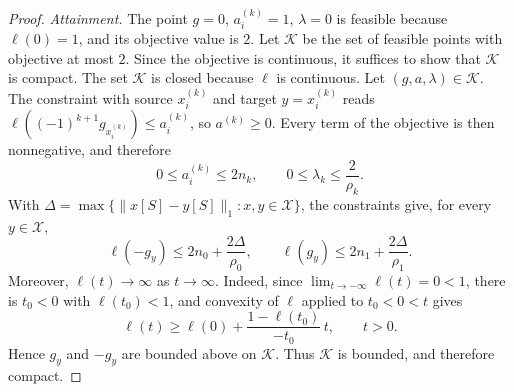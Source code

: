 \documentclass[11pt,a4paper]{article}
\theoremstyle{plain}
\begin{document}
\begin{proof}
\emph{Attainment.}
The point $g=0$, $a_i^{(k)}=1$, $\lambda=0$ is feasible because
$\ell(0)=1$, and its objective value is $2$. Let $\mathcal K$ be the
set of feasible points with objective at most $2$. Since the objective
is continuous, it suffices to show that $\mathcal K$ is compact. The
set $\mathcal K$ is closed because $\ell$ is continuous. Let
$(g,a,\lambda)\in\mathcal K$. The constraint with source $x_i^{(k)}$
and target $y=x_i^{(k)}$ reads
$\ell((-1)^{k+1}g_{x_i^{(k)}})\le a_i^{(k)}$, so $a^{(k)}\ge0$. Every
term of the objective is then nonnegative, and therefore
\[
0\le a_i^{(k)}\le2n_k,\qquad 0\le\lambda_k\le\frac2{\rho_k}.
\]
With $\Delta=\max\{\|x[S]-y[S]\|_1:x,y\in\mathcal X\}$, the
constraints give, for every $y\in\mathcal X$,
\[
\ell(-g_y)\le2n_0+\frac{2\Delta}{\rho_0},\qquad
\ell(g_y)\le2n_1+\frac{2\Delta}{\rho_1}.
\]
Moreover, $\ell(t)\to\infty$ as $t\to\infty$. Indeed, since
$\lim_{t\to-\infty}\ell(t)=0<1$, there is $t_0<0$ with $\ell(t_0)<1$,
and convexity of $\ell$ applied to $t_0<0<t$ gives
\[
\ell(t)\ge\ell(0)+\frac{1-\ell(t_0)}{-t_0}\,t,\qquad t>0.
\]
Hence $g_y$ and $-g_y$ are bounded above on $\mathcal K$. Thus
$\mathcal K$ is bounded, and therefore compact.
\end{proof}
\end{document}
